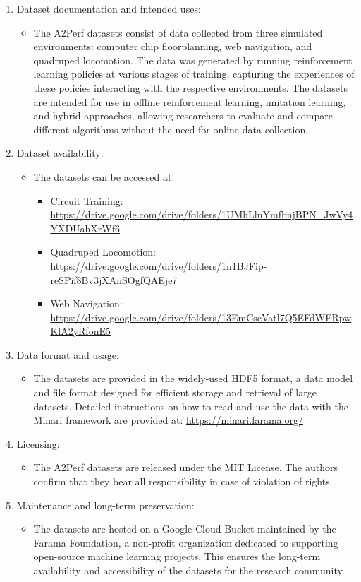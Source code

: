 \begin{enumerate}
\item Dataset documentation and intended uses:
\begin{itemize}
\item The A2Perf datasets consist of data collected from three simulated environments: computer chip floorplanning, web navigation, and quadruped locomotion. The data was generated by running reinforcement learning policies at various stages of training, capturing the experiences of these policies interacting with the respective environments. The datasets are intended for use in offline reinforcement learning, imitation learning, and hybrid approaches, allowing researchers to evaluate and compare different algorithms without the need for online data collection.
\end{itemize}
\item Dataset availability:

\begin{itemize}
\item The datasets can be accessed at:
\begin{itemize}
\item Circuit Training: \url{https://drive.google.com/drive/folders/1UMhLlnYmfbnjBPN_JwVy4YXDUahXrWf6}
\item Quadruped Locomotion: \url{https://drive.google.com/drive/folders/1n1BJFip-reSPif8Bv3jXAnSOgfQAEje7}
\item Web Navigation: \url{https://drive.google.com/drive/folders/13EmCscVatl7Q5EFdWFRpwKlA2yRfonE5}
\end{itemize}
\end{itemize}

\item Data format and usage:
\begin{itemize}
\item The datasets are provided in the widely-used HDF5 format, a data model and file format designed for efficient storage and retrieval of large datasets. Detailed instructions on how to read and use the data with the Minari framework are provided at: \url{https://minari.farama.org/}
\end{itemize}
\item Licensing:
\begin{itemize}
\item The A2Perf datasets are released under the MIT License. The authors confirm that they bear all responsibility in case of violation of rights.
\end{itemize}
\item Maintenance and long-term preservation:
\begin{itemize}
\item The datasets are hosted on a Google Cloud Bucket maintained by the Farama Foundation, a non-profit organization dedicated to supporting open-source machine learning projects. This ensures the long-term availability and accessibility of the datasets for the research community.
\end{itemize}
\end{enumerate}